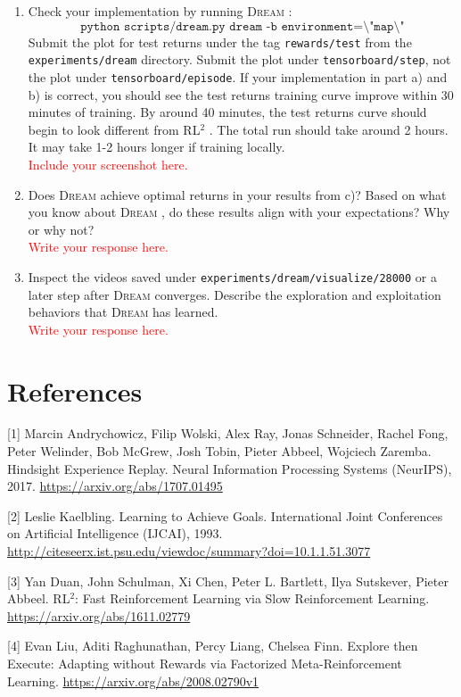 \documentclass[12pt]{article}
\newcommand{\rl}{{RL$^2$ }}
\newcommand{\dream}{\textsc{Dream }}
\begin{document}
\begin{enumerate}
    \item
        Check your implementation by running \dream:
        \begin{equation*}
            \texttt{python scripts/dream.py dream -b environment=\textbackslash"map\textbackslash"}
        \end{equation*}
        Submit the plot for test returns under the tag \texttt{rewards/test} from the \texttt{experiments/dream} directory.
        Submit the plot under \texttt{tensorboard/step}, not the plot under \texttt{tensorboard/episode}.
        If your implementation in part a) and b) is correct, you should see the test returns training curve improve within 30 minutes of training.
        By around 40 minutes, the test returns curve should begin to look different from \rl. The total run should take around 2 hours. It may take 1-2 hours longer if training locally. \\
        \textcolor{red}{Include your screenshot here.}
        
    \item
        Does \dream achieve optimal returns in your results from c)? Based on what you know about \dream, do these results align with your expectations? Why or why not? \\ 
        \textcolor{red}{Write your response here.}
        
    \item
        Inspect the videos saved under \texttt{experiments/dream/visualize/28000} or a later step after \dream converges. Describe the exploration and exploitation behaviors that \dream has learned. \\
        \textcolor{red}{Write your response here.}
\end{enumerate}

\newpage

\section*{References}

[1] Marcin Andrychowicz, Filip Wolski, Alex Ray, Jonas Schneider, Rachel Fong, Peter Welinder, Bob McGrew, Josh Tobin, Pieter Abbeel, Wojciech Zaremba. Hindsight Experience Replay. Neural Information Processing Systems (NeurIPS), 2017. \url{https://arxiv.org/abs/1707.01495}

[2] Leslie Kaelbling. Learning to Achieve Goals. International Joint Conferences on Artificial Intelligence (IJCAI), 1993. \url{http://citeseerx.ist.psu.edu/viewdoc/summary?doi=10.1.1.51.3077}

[3] Yan Duan, John Schulman, Xi Chen, Peter L. Bartlett, Ilya Sutskever, Pieter Abbeel. RL$^2$: Fast Reinforcement Learning via Slow Reinforcement Learning. \url{https://arxiv.org/abs/1611.02779}

[4] Evan Liu, Aditi Raghunathan, Percy Liang, Chelsea Finn. Explore then Execute: Adapting without Rewards via Factorized Meta-Reinforcement Learning. \url{https://arxiv.org/abs/2008.02790v1}
\end{document}
